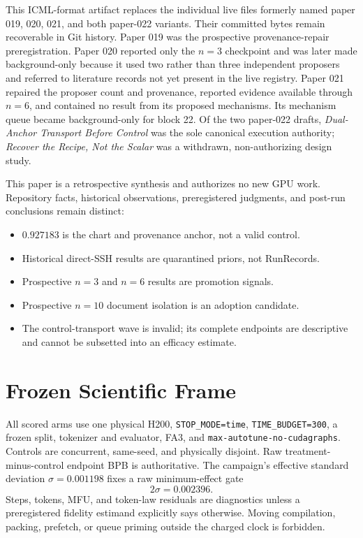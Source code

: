 \documentclass{article}
\begin{document}
This ICML-format artifact replaces the individual live files formerly named
paper 019, 020, 021, and both paper-022 variants.  Their committed bytes remain
recoverable in Git history.  Paper 019 was the prospective provenance-repair
preregistration.  Paper 020 reported only the $n=3$ checkpoint and was later
made background-only because it used two rather than three independent
proposers and referred to literature records not yet present in the live
registry.  Paper 021 repaired the proposer count and provenance, reported
evidence available through $n=6$, and contained no result from its proposed
mechanisms.  Its mechanism queue became background-only for block 22.  Of the
two paper-022 drafts, \emph{Dual-Anchor Transport Before Control} was the sole
canonical execution authority; \emph{Recover the Recipe, Not the Scalar} was
a withdrawn, non-authorizing design study.

This paper is a retrospective synthesis and authorizes no new GPU work.
Repository facts, historical observations, preregistered judgments, and
post-run conclusions remain distinct:
\begin{itemize}
\item $0.927183$ is the chart and provenance anchor, not a valid control.
\item Historical direct-SSH results are quarantined priors, not RunRecords.
\item Prospective $n=3$ and $n=6$ results are promotion signals.
\item Prospective $n=10$ document isolation is an adoption candidate.
\item The control-transport wave is invalid; its complete endpoints are
descriptive and cannot be subsetted into an efficacy estimate.
\end{itemize}

\section{Frozen Scientific Frame}

All scored arms use one physical H200, \texttt{STOP\_MODE=time},
\texttt{TIME\_BUDGET=300}, a frozen split, tokenizer and evaluator, FA3,
and \texttt{max-autotune-no-cudagraphs}.  Controls are concurrent,
same-seed, and physically disjoint.  Raw treatment-minus-control endpoint BPB
is authoritative.  The campaign's effective standard deviation
$\sigma=0.001198$ fixes a raw minimum-effect gate
\[
                 2\sigma=0.002396.
\]
Steps, tokens, MFU, and token-law residuals are diagnostics unless a
preregistered fidelity estimand explicitly says otherwise.  Moving compilation,
packing, prefetch, or queue priming outside the charged clock is forbidden.
\end{document}
